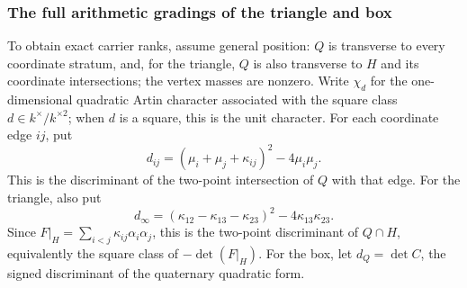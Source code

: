 \documentclass[11pt,a4paper,oneside]{article}
\theoremstyle{plain}
\theoremstyle{definition}
\theoremstyle{remark}
\numberwithin{equation}{section}
\begin{document}
\subsubsection{The full arithmetic gradings of the triangle and box}
To obtain exact carrier ranks, assume general position: $Q$ is transverse to every coordinate stratum,
and, for the triangle, $Q$ is also transverse to $H$ and its coordinate intersections; the vertex masses are nonzero.
Write $\chi_d$ for the one-dimensional quadratic Artin character associated with the square class $d\in k^\times/k^{\times2}$;
when $d$ is a square, this is the unit character. For each coordinate edge $ij$, put
\begin{equation}\label{unified:eq:edgedisc}
 d_{ij}=(\mu_i+\mu_j+\kappa_{ij})^2-4\mu_i\mu_j .
\end{equation}
This is the discriminant of the two-point intersection of $Q$ with that edge.
For the triangle, also put
\[
 d_\infty=(\kappa_{12}-\kappa_{13}-\kappa_{23})^2
                          -4\kappa_{13}\kappa_{23}.
\]
Since $F|_H=\sum_{i<j}\kappa_{ij}\alpha_i\alpha_j$,
this is the two-point discriminant of $Q\cap H$, equivalently the square class of $-\det(F|_H)$.
For the box, let $d_Q=\det C$, the signed discriminant of the quaternary quadratic form.
\end{document}
